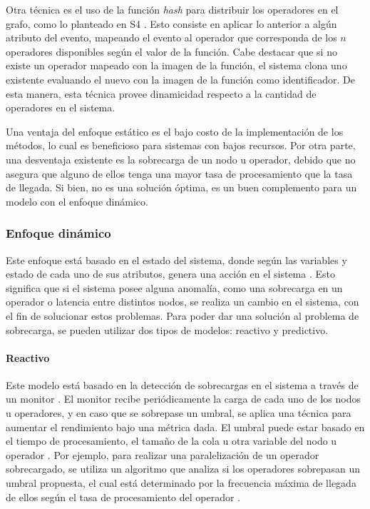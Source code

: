 \documentclass[12pt,letterpaper]{article}
\begin{document}
Otra técnica es el uso de la función \textsl{hash} \cite{RogawayS04} para distribuir los operadores en el grafo, como lo planteado en S4 \cite{s4yahoo}. Esto consiste en aplicar lo anterior a algún atributo del evento, mapeando el evento al operador que corresponda de los $n$ operadores disponibles según el valor de la función. Cabe destacar que si no existe un operador mapeado con la imagen de la función, el sistema clona uno existente evaluando el nuevo con la imagen de la función como identificador. De esta manera, esta técnica provee dinamicidad respecto a la cantidad de operadores en el sistema.

Una ventaja del enfoque estático es el bajo costo de la implementación de los métodos, lo cual es beneficioso para sistemas con bajos recursos. Por otra parte, una desventaja existente es la sobrecarga de un nodo u operador, debido que no asegura que alguno de ellos tenga una mayor tasa de procesamiento que la tasa de llegada. Si bien, no es una solución óptima, es un buen complemento para un modelo con el enfoque dinámico.

\subsubsection{Enfoque dinámico}

Este enfoque está basado en el estado del sistema, donde según las variables y estado de cada uno de sus atributos, genera una acción en el sistema \cite{CasavantK88}. Esto significa que si el sistema posee alguna anomalía, como una sobrecarga en un operador o latencia entre distintos nodos, se realiza un cambio en el sistema, con el fin de solucionar estos problemas. Para poder dar una solución al problema de sobrecarga, se pueden utilizar dos tipos de modelos: reactivo y predictivo.

\paragraph{Reactivo}

Este modelo está basado en la detección de sobrecargas en el sistema a través de un monitor \cite{GulisanoJPSV12}. El monitor recibe periódicamente la carga de cada uno de los nodos u operadores, y en caso que se sobrepase un umbral, se aplica una técnica para aumentar el rendimiento bajo una métrica dada. El umbral puede estar basado en el tiempo de procesamiento, el tamaño de la cola u otra variable del nodo u operador \cite{BhuvanagiriGKS06}. Por ejemplo, para realizar una paralelización de un operador sobrecargado, se utiliza un algoritmo que analiza si los operadores sobrepasan un umbral propuesta, el cual está determinado por la frecuencia máxima de llegada de ellos según el tasa de procesamiento del operador \cite{SchneiderAGBW09}.
\end{document}
